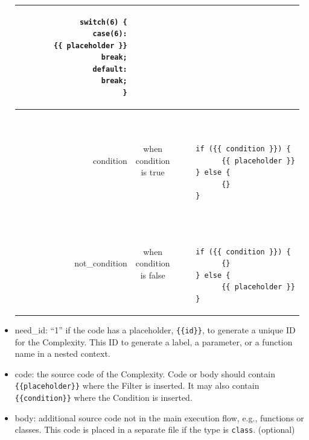 \begin{itemize}
\begin{table}[H]
\begin{tabular}{|r|c|l|}
\begin{minipage}{3in}
\begin{verbatim}
    switch(6) {
      case(6):
        {{ placeholder }}
        break;
      default:
        break;
    }
    \end{verbatim}
    \end{minipage}
    \\
    \hline
    condition &
    \makecell{when \\ condition \\ is true} &
    \begin{minipage}{3in}
    \begin{verbatim}


    if ({{ condition }}) {
          {{ placeholder }}
    } else {
          {}
    }
    \end{verbatim}
    \end{minipage}
    \\
    \hline
    not\_condition &
    \makecell{when \\ condition \\ is false} &
    \begin{minipage}{3in}
    \begin{verbatim}


    if ({{ condition }}) {
          {}
    } else {
          {{ placeholder }}
    }
    \end{verbatim}
    \end{minipage}
    \\
    \hline
    \end{tabular}
    \label{tab:execution examples}
    \end{table}

    \item need\_id: ``1'' if the code has a placeholder, \verb|{{id}}|,
    to generate a unique ID for the Complexity.  This ID to generate 
    a label, a parameter, or a function name in a nested
    context.

    \item code: the source code of the Complexity.  Code or 
    body should contain \\ \verb|{{placeholder}}|
    where the Filter is inserted.  It may also contain
    \verb|{{condition}}| where the Condition
    is inserted.

    \item body: additional source code not in the main execution flow,
    e.g., functions or classes.  This code is placed in a separate file
    if the type is \verb|class|. (optional)
\end{itemize}


